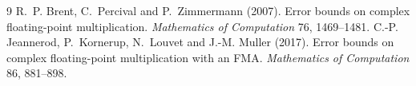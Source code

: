\documentclass[11pt]{article}
\theoremstyle{definition}
\begin{document}
\begin{thebibliography}{9}
 R.~P. Brent, C.~Percival and P.~Zimmermann (2007). Error bounds on complex floating-point
multiplication. \emph{Mathematics of Computation} 76, 1469--1481.
 C.-P. Jeannerod, P.~Kornerup, N.~Louvet and J.-M. Muller (2017). Error bounds on complex
floating-point multiplication with an FMA. \emph{Mathematics of Computation} 86, 881--898.
\end{thebibliography}
\end{document}
